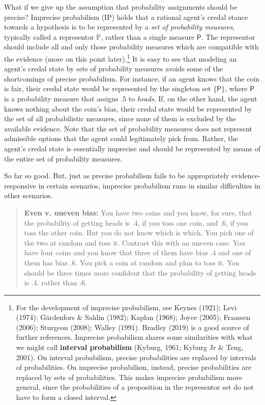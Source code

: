 \documentclass[
  letterpaper,
  DIV=11,
  numbers=noendperiod]{scrartcl}
\begin{document}
What if we give up the assumption that probability assignments should be
precise? Imprecise probabilism (\textsf{IP}) holds that a rational
agent's credal stance towards a hypothesis is to be represented by a
\emph{set of probability measures}, typically called a representor
\(\mathbb{P}\), rather than a single measure \(\mathsf{P}\). The
representor should include all and only those probability measures which
are compatible with the evidence (more on this point later).\footnote{For
  the development of imprecise probabilism, see Keynes (1921); Levi
  (1974); Gärdenfors \& Sahlin (1982); Kaplan (1968); Joyce (2005);
  Fraassen (2006); Sturgeon (2008); Walley (1991). Bradley (2019) is a
  good source of further references. Imprecise probabilism shares some
  similarities with what we might call \textbf{interval probabilism}
  (Kyburg, 1961; Kyburg Jr \& Teng, 2001). On interval probabilism,
  precise probabilities are replaced by intervals of probabilities. On
  imprecise probabilism, instead, precise probabilities are replaced by
  sets of probabilities. This makes imprecise probabilism more general,
  since the probabilities of a proposition in the representor set do not
  have to form a closed interval.} It is easy to see that modeling an
agent's credal state by sets of probability measures avoids some of the
shortcomings of precise probabilism. For instance, if an agent knows
that the coin is fair, their credal state would be represented by the
singleton set \(\{\mathsf{P}\}\), where \(\mathsf{P}\) is a probability
measure that assigns \(.5\) to \emph{heads}. If, on the other hand, the
agent knows nothing about the coin's bias, their credal state would be
represented by the set of all probabilistic measures, since none of them
is excluded by the available evidence. Note that the set of probability
measures does not represent admissible options that the agent could
legitimately pick from. Rather, the agent's credal state is essentially
imprecise and should be represented by means of the entire set of
probability measures.

So far so good. But, just as precise probabilism fails to be
appropriately evidence-responsive in certain scenarios, imprecise
probabilism runs in similar difficulties in other scenarios.

\begin{quote}
\textbf{Even v. uneven bias:}
 You have two coins and you know, for sure, that the probability of getting heads is .4, if you toss one coin, and .6, if you toss the other coin. But you do not know which is which. You pick one of the two at random and toss it.  Contrast this with an uneven case. You have four coins and you know that three of them have bias $.4$ and one of them has bias $.6$. You pick a coin at random and plan to toss it. You should be three times more confident that the probability of getting heads is .4. rather than .6.
\end{quote}
\end{document}
